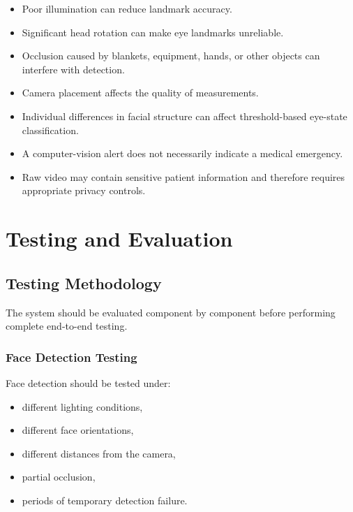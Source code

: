 \documentclass[12pt]{tietreport}
\begin{document}
\begin{itemize}[leftmargin=*]

    \item Poor illumination can reduce landmark accuracy.

    \item Significant head rotation can make eye landmarks unreliable.

    \item Occlusion caused by blankets, equipment, hands, or other
    objects can interfere with detection.

    \item Camera placement affects the quality of measurements.

    \item Individual differences in facial structure can affect
    threshold-based eye-state classification.

    \item A computer-vision alert does not necessarily indicate a
    medical emergency.

    \item Raw video may contain sensitive patient information and
    therefore requires appropriate privacy controls.

\end{itemize}


\chapter{Testing and Evaluation}

\section{Testing Methodology}

The system should be evaluated component by component before
performing complete end-to-end testing.

\subsection{Face Detection Testing}

Face detection should be tested under:

\begin{itemize}[leftmargin=*]
    \item different lighting conditions,
    \item different face orientations,
    \item different distances from the camera,
    \item partial occlusion,
    \item periods of temporary detection failure.
\end{itemize}
\end{document}
